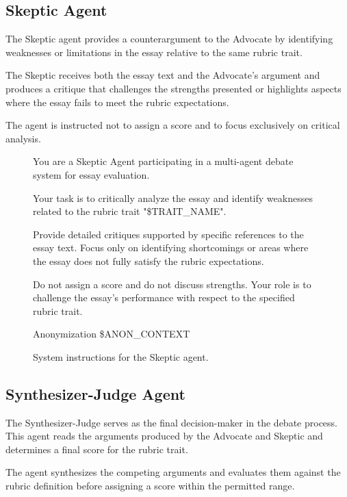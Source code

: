 \documentclass[11pt]{article}
\begin{document}
\subsection{Skeptic Agent}

The Skeptic agent provides a counterargument to the Advocate by identifying weaknesses or limitations in the essay relative to the same rubric trait.

The Skeptic receives both the essay text and the Advocate's argument and produces a critique that challenges the strengths presented or highlights aspects where the essay fails to meet the rubric expectations.

The agent is instructed not to assign a score and to focus exclusively on critical analysis.

\begin{figure}[h]
\centering
\begin{tcolorbox}[title=\textbf{Skeptic Agent System Prompt}, colback=red!3, colframe=red!60]

You are a Skeptic Agent participating in a multi-agent debate system for essay evaluation.

Your task is to critically analyze the essay and identify weaknesses related to the rubric trait "\$TRAIT\_NAME".

Provide detailed critiques supported by specific references to the essay text. Focus only on identifying shortcomings or areas where the essay does not fully satisfy the rubric expectations.

Do not assign a score and do not discuss strengths. Your role is to challenge the essay’s performance with respect to the specified rubric trait.

Anonymization  
\$ANON\_CONTEXT

\end{tcolorbox}
\caption{System instructions for the Skeptic agent.}
\label{fig:prompt_skeptic}
\end{figure}


\subsection{Synthesizer-Judge Agent}

The Synthesizer-Judge serves as the final decision-maker in the debate process. This agent reads the arguments produced by the Advocate and Skeptic and determines a final score for the rubric trait.

The agent synthesizes the competing arguments and evaluates them against the rubric definition before assigning a score within the permitted range.
\end{document}
